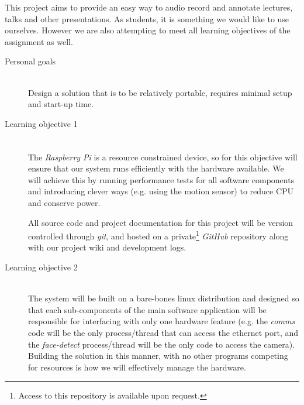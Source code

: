 \documentclass[11pt,a4paper,titlepage]{report}
\newcommand{\rpi}{\textit{Raspberry Pi\textsuperscript{\textregistered}}}
\begin{document}
This project aims to provide an easy way to audio record and annotate lectures, talks and other presentations. As students, it is something we would like to use ourselves. However we are also attempting to meet all learning objectives of the assignment as well.

\begin{description}
   
  \item[Personal goals] \hfill \\
      Design a solution that is to be relatively portable, requires minimal setup and start-up time. 
      
  \item[Learning objective 1] \hfill \\
The \rpi\xspace is a resource constrained device, so for this objective will ensure that our system runs efficiently with the hardware available. We will achieve this by running performance tests for all software components and introducing clever ways (e.g. using the motion sensor) to reduce CPU and conserve power. 

All source code and project documentation for this project will be version controlled through \textit{git}, and hosted on a private\footnote{Access to this repository is available upon request.} \textit{GitHub} repository along with our project wiki and development logs.

  \item[Learning objective 2] \hfill \\
The system will be built on a bare-bones linux distribution and designed so that each sub-components of the main software application will be responsible for interfacing with only one hardware feature (e.g. the \textit{comms} code will be the only process/thread that can access the ethernet port, and the \textit{face-detect} process/thread will be the only code to access the camera). Building the solution in this manner, with no other programs competing for resources is how we will effectively manage the hardware.


\end{description}
\end{document}
